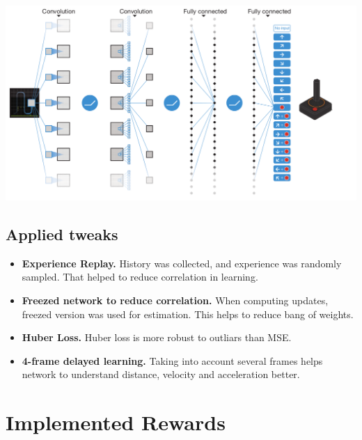 \documentclass{article}
\begin{document}
\includegraphics[scale=0.3]{dqn_crop.png}

\subsection{Applied tweaks}

\begin{itemize}
    \item {\bf Experience Replay.} History was collected, and experience was randomly sampled. That helped to reduce correlation in learning.
    \item {\bf Freezed network to reduce correlation.} When computing updates, freezed version was used for estimation. This helps
        to reduce bang of weights.
    \item {\bf Huber Loss.} Huber loss is more robust
        to outliars than MSE.
    \item {\bf 4-frame delayed learning.}
        Taking into account several frames helps network to understand
        distance, velocity and acceleration better.
\end{itemize}

\section{Implemented Rewards}
\end{document}

